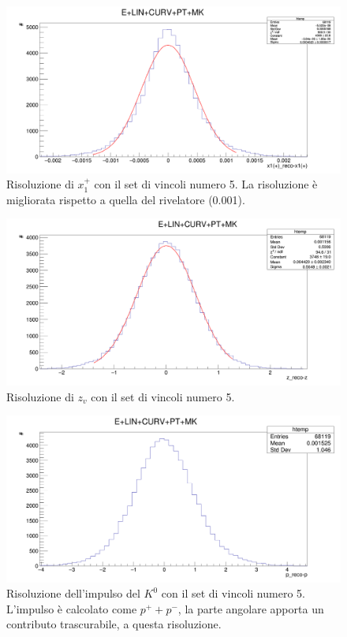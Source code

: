 \documentclass[8pt]{extarticle}
\begin{document}
\begin{figure}[h!]
	\begin{center}
		\includegraphics[scale=0.25]{set_5_x} 
		\caption{Risoluzione di $x_1^+$ con il set di vincoli numero 5. La risoluzione è migliorata rispetto a quella del rivelatore (0.001).}
		\label{fig:set_5_x}
	\end{center}
\end{figure}

\clearpage

\begin{figure}[h!]
	\begin{center}
		\includegraphics[scale=0.25]{set_5_z} 
		\caption{Risoluzione di $z_v$ con il set di vincoli numero 5.}
		\label{fig:set_5_z}
	\end{center}
\end{figure}

\begin{figure}[h!]
	\begin{center}
		\includegraphics[scale=0.25]{set_5_p} 
		\caption{Risoluzione dell'impulso del $K^0$ con il set di vincoli numero 5. L'impulso è calcolato come $p^+ + p^-$, la parte angolare apporta un contributo trascurabile, a questa risoluzione.}
		\label{fig:set_5_p}
	\end{center}
\end{figure}
\end{document}
